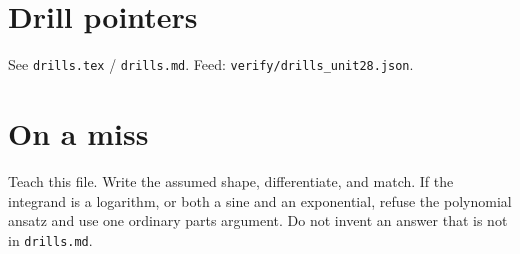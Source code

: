 \section{Drill pointers}
See \texttt{drills.tex} / \texttt{drills.md}. Feed: \texttt{verify/drills\_unit28.json}.

\section*{On a miss}
Teach this file. Write the assumed shape, differentiate, and match. If the integrand is a logarithm, or both a sine and an exponential, refuse the polynomial ansatz and use one ordinary parts argument. Do not invent an answer that is not in \texttt{drills.md}.

